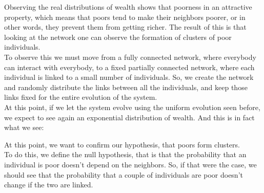 Observing the real distributions of wealth shows that poorness in an attractive property, which means that poors tend to make their neighbors poorer, or in other words, they prevent them from getting richer. The result of this is that looking at the network one can observe the formation of clusters of poor individuals. \\
To observe this we must move from a fully connected network, where everybody can interact with everybody, to a fixed partially connected network, where each individual is linked to a small number of individuals. So, we create the network and randomly distribute the links between all the individuals, and keep those links fixed for the entire evolution of the system. \\
At this point, if we let the system evolve using the uniform evolution seen before, we expect to see again an exponential distribution of wealth. And this is in fact what we see:
\begin{figure}[ht!]
    \centering
    \scalebox{.7}{}
    \caption{\emph{}}
    \label{fig:fixedExpo}
\end{figure}
At this point, we want to confirm our hypothesis, that poors form clusters. \\
To do this, we define the null hypothesis, that is that the probability that an individual is poor doesn't depend on the neighbors. So, if that were the case, we should see that the probability that a couple of individuals are poor doesn't change if the two are linked.
